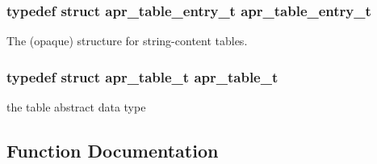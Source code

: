 \subsubsection[{\texorpdfstring{apr\+\_\+table\+\_\+entry\+\_\+t}{apr_table_entry_t}}]{\setlength{\rightskip}{0pt plus 5cm}typedef struct {\bf apr\+\_\+table\+\_\+entry\+\_\+t} {\bf apr\+\_\+table\+\_\+entry\+\_\+t}}\hypertarget{group__apr__tables_gac7e0151b714e58b75c597dafed75df3f}{}\label{group__apr__tables_gac7e0151b714e58b75c597dafed75df3f}
The (opaque) structure for string-\/content tables. 
\subsubsection[{\texorpdfstring{apr\+\_\+table\+\_\+t}{apr_table_t}}]{\setlength{\rightskip}{0pt plus 5cm}typedef struct {\bf apr\+\_\+table\+\_\+t} {\bf apr\+\_\+table\+\_\+t}}\hypertarget{group__apr__tables_gad7ea82d6608a4a633fc3775694ab71e4}{}\label{group__apr__tables_gad7ea82d6608a4a633fc3775694ab71e4}
the table abstract data type 

\subsection{Function Documentation}
